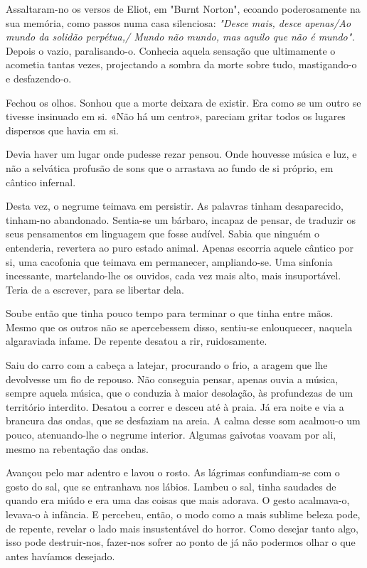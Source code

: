 Assaltaram-no os versos de Eliot, em "Burnt Norton", ecoando
poderosamente na sua memória, como passos numa casa silenciosa:\emph{
"Desce mais, desce apenas/Ao mundo da solidão perpétua,/ Mundo não
mundo, mas aquilo que não é mundo". }Depois o vazio, paralisando-o.
Conhecia aquela sensação que ultimamente o acometia tantas vezes,
projectando a sombra da morte sobre tudo, mastigando-o e desfazendo-o.

Fechou os olhos. Sonhou que a morte deixara de existir. Era como se um
outro se tivesse insinuado em si. «Não há um centro», pareciam gritar
todos os lugares dispersos que havia em si.

Devia haver um lugar onde pudesse rezar pensou. Onde houvesse música e
luz, e não a selvática profusão de sons que o arrastava ao fundo de si
próprio, em cântico infernal.

Desta vez, o negrume teimava em persistir. As palavras tinham
desaparecido, tinham-no abandonado. Sentia-se um bárbaro, incapaz de
pensar, de traduzir os seus pensamentos em linguagem que fosse audível.
Sabia que ninguém o entenderia, revertera ao puro estado animal. Apenas
escorria aquele cântico por si, uma cacofonia que teimava em permanecer,
ampliando-se. Uma sinfonia incessante, martelando-lhe os ouvidos, cada
vez mais alto, mais insuportável. Teria de a escrever, para se libertar
dela.

Soube então que tinha pouco tempo para terminar o que tinha entre mãos.
Mesmo que os outros não se apercebessem disso, sentiu-se enlouquecer,
naquela algaraviada infame. De repente desatou a rir, ruidosamente.

Saiu do carro com a cabeça a latejar, procurando o frio, a aragem que
lhe devolvesse um fio de repouso. Não conseguia pensar, apenas ouvia a
música, sempre aquela música, que o conduzia à maior desolação, às
profundezas de um território interdito. Desatou a correr e desceu até à
praia. Já era noite e via a brancura das ondas, que se desfaziam na
areia. A calma desse som acalmou-o um pouco, atenuando-lhe o negrume
interior. Algumas gaivotas voavam por ali, mesmo na rebentação das
ondas.

Avançou pelo mar adentro e lavou o rosto. As lágrimas confundiam-se com
o gosto do sal, que se entranhava nos lábios. Lambeu o sal, tinha
saudades de quando era miúdo e era uma das coisas que mais adorava. O
gesto acalmava-o, levava-o à infância. E percebeu, então, o modo como a
mais sublime beleza pode, de repente, revelar o lado mais insustentável
do horror. Como desejar tanto algo, isso pode destruir-nos, fazer-nos
sofrer ao ponto de já não podermos olhar o que antes havíamos desejado.


